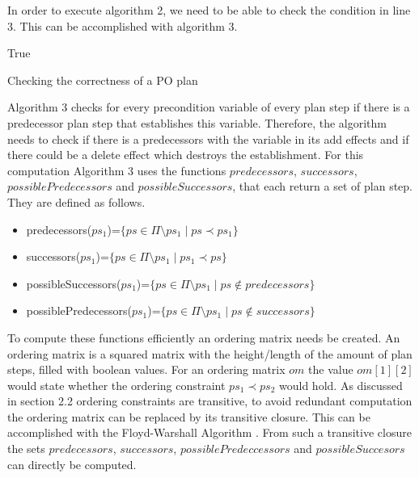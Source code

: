 In order to execute algorithm 2, we need to be able to check the condition in line 3. This can be accomplished with algorithm 3.
\newpage

\begin{algorithm}[h]
    \SetAlgoLined
    \Return True \;
    \caption{Checking the correctness of a PO plan}
\end{algorithm}

Algorithm 3 checks for every precondition variable of every plan step if there is a predecessor plan step that establishes this variable.
Therefore, the algorithm needs to check if there is a predecessors with the variable in its add effects and if there could be a delete effect 
which destroys the establishment. 
For this computation Algorithm 3 uses the functions $predecessors$, $successors$, $possiblePredecessors$ and $possibleSuccessors$, that each return a set of plan step.
They are defined as follows.

\begin{itemize}
    \item predecessors($ps_1$)=$\{ps \in \Pi \setminus ps_1 \mid ps \prec ps_1 \}$
    \item successors($ps_1$)=$\{ps \in \Pi \setminus ps_1 \mid ps_1 \prec ps \}$
    \item possibleSuccessors($ps_1$)=$\{ps \in \Pi \setminus ps_1 \mid ps \notin predecessors\}$
    \item possiblePredecessors($ps_1$)=$\{ps \in \Pi \setminus ps_1 \mid ps \notin successors \}$
\end{itemize}

To compute these functions efficiently an ordering matrix needs be created. 
An ordering matrix is a squared matrix with the height/length of the amount of plan steps, filled with boolean values. For an ordering matrix $om$ the value 
$om[1][2]$ would state whether the ordering constraint $ps_1 \prec ps_2$ would hold.
As discussed in section 2.2 ordering constraints are transitive, to avoid redundant computation the ordering matrix can be replaced
by its transitive closure. This can be accomplished with the Floyd-Warshall Algorithm \cite{Floyd}. 
From such a transitive closure the sets $predecessors$, $successors$, $possiblePredeccessors$ and $possibleSuccesors$ can directly be computed.


